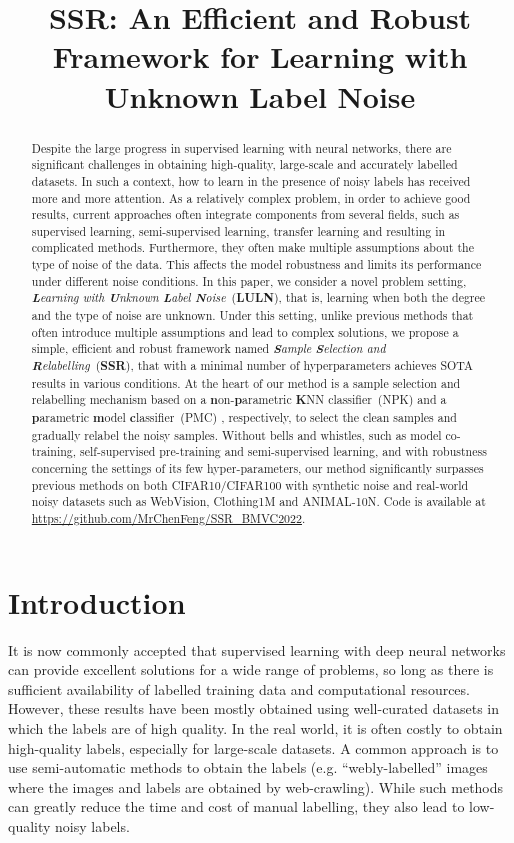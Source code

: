 \documentclass{bmvc2k}
\title{SSR: An Efficient and Robust Framework for Learning with Unknown Label Noise}
\begin{document}
\maketitle
\begin{abstract}
Despite the large progress in supervised learning with neural networks, there are significant challenges in obtaining high-quality, large-scale and accurately labelled datasets. In such a context, how to learn in the presence of noisy labels has received more and more attention. As a relatively complex problem, in order to achieve good results, current approaches often integrate components from several fields, such as supervised learning, semi-supervised learning, transfer learning and resulting in complicated methods. Furthermore, they often make multiple assumptions about the type of noise of the data. This affects the model robustness and limits its performance under different noise conditions. 
In this paper, we consider a novel problem setting, \textit{\textbf{L}earning with \textbf{U}nknown \textbf{L}abel \textbf{N}oise}~(\textbf{LULN}), that is, learning when both the degree and the type of noise are unknown. Under this setting, unlike previous methods that often introduce multiple assumptions and lead to complex solutions, we propose a simple, efficient and robust framework named \textit{\textbf{S}ample \textbf{S}election and \textbf{R}elabelling}~(\textbf{SSR}), that with a minimal number of hyperparameters achieves SOTA results in various conditions. At the heart of our method is a sample selection and relabelling mechanism based on a \textbf{n}on-\textbf{p}arametric \textbf{K}NN classifier~(NPK)  and a \textbf{p}arametric \textbf{m}odel \textbf{c}lassifier~(PMC) , respectively, to select the clean samples and gradually relabel the noisy samples.
Without bells and whistles, such as model co-training, self-supervised pre-training and semi-supervised learning, and with robustness concerning the settings of its few hyper-parameters, our method significantly surpasses previous methods on both CIFAR10/CIFAR100 with synthetic noise and real-world noisy datasets such as WebVision, Clothing1M and ANIMAL-10N. Code is available at \url{https://github.com/MrChenFeng/SSR_BMVC2022}.
\end{abstract}

\section{Introduction}
It is now commonly accepted that supervised learning with deep neural networks can provide excellent solutions for a wide range of problems, so long as there is sufficient availability of labelled training data and computational resources. However, these results have been mostly obtained using well-curated datasets in which the labels are of high quality. In the real world, it is often costly to obtain high-quality labels, especially for large-scale datasets. A common approach is to use semi-automatic methods to obtain the labels (e.g. ``webly-labelled'' images where the images and labels are obtained by web-crawling). While such methods can greatly reduce the time and cost of manual labelling, they also lead to low-quality noisy labels. 
\end{document}
